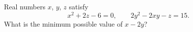 Real numbers $x$, $y$, $z$ satisfy
\[
x^2+2z-6=0,\qquad 2y^2-2xy-z=15 .
\]
What is the minimum possible value of $x-2y$?
